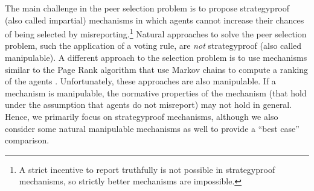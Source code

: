 \documentclass[letterpaper]{article}
\newcommand{\omer}[1]{\textcolor{purple}{\textbf{Omer Says: #1}}}
\newcommand{\citep}{\cite}
\begin{document}
The main challenge in the peer selection problem is to propose strategyproof (also called impartial) mechanisms in which agents cannot increase their chances of being selected by misreporting.\footnote{A strict incentive to report truthfully is not possible in strategyproof mechanisms, so strictly better mechanisms are impossible.} 
Natural approaches to solve the peer selection problem, such the application of a voting rule, are \emph{not} strategyproof (also called manipulable).
A different approach to the selection problem is to use mechanisms similar to the Page Rank algorithm that use Markov chains to compute a ranking of the agents \cite{Wals14a}. Unfortunately, these approaches are also manipulable. If a mechanism is manipulable, the normative properties of the mechanism (that hold under the assumption that agents do not misreport) may not hold in general. Hence, we primarily focus on strategyproof mechanisms, although we also consider some natural manipulable mechanisms as well to provide a ``best case'' comparison. 






\end{document}
